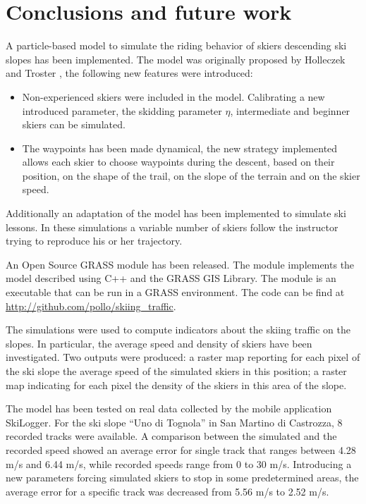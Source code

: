 \documentclass[12pt,a4paper,twoside]{book}
\begin{document}
\chapter{Conclusions and future work}\label{conclusions}
A particle-based model to simulate the riding behavior of skiers descending ski slopes has been implemented. The model was originally proposed by Holleczek and Troster \cite{hol2012}, the following new features were introduced:
\begin{itemize}
\item Non-experienced skiers were included in the model. Calibrating a new introduced parameter, the skidding parameter $\eta$, intermediate and beginner skiers can be simulated.
\item The waypoints has been made dynamical, the new strategy implemented allows each skier to choose waypoints during the descent, based on their position, on the shape of the trail, on the slope of the terrain and on the skier speed.
\end{itemize}
Additionally an adaptation of the model has been implemented to simulate ski lessons. In these simulations a variable number of skiers follow the instructor trying to reproduce his or her trajectory.

An Open Source GRASS module has been released. The module implements the model described using C++ and the GRASS GIS Library. The module is an executable that can be run in a GRASS environment. The code can be find at \url{http://github.com/pollo/skiing_traffic}.

The simulations were used to compute indicators about the skiing traffic on the slopes. In particular, the average speed and density of skiers have been investigated. Two outputs were produced: a raster map reporting for each pixel of the ski slope the average speed of the simulated skiers in this position; a raster map indicating for each pixel the density of the skiers in this area of the slope.

The model has been tested on real data collected by the mobile application SkiLogger. For the ski slope ``Uno di Tognola'' in San Martino di Castrozza, 8 recorded tracks were available. A comparison between the simulated and the recorded speed showed an average error for single track that ranges between 4.28 m/s and 6.44 m/s, while recorded speeds range from 0 to 30 m/s. Introducing a new parameters forcing simulated skiers to stop in some predetermined areas, the average error for a specific track was decreased from 5.56 m/s to 2.52 m/s.
\end{document}
